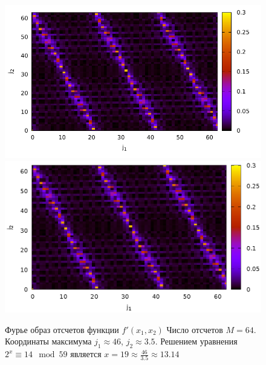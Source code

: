 \begin{figure}
\centering

\ifpdf
\includegraphics[angle=0]
{./part4/quantcomp/picdiscretlog4.pdf}
\else
\includegraphics[angle=0]
{./part4/quantcomp/picdiscretlog4.eps}
\fi

%

\caption{Фурье образ отсчетов функции 
$f'(x_1, x_2)$
Число отсчетов $M=64$. Координаты максимума $j_1 \approx 46$, $j_2 \approx 3.5$. 
Решением уравнения $2^x \equiv 14 \mod 59$
является $x = 19 \approx \frac{46}{3.5} \approx 13.14$
} 
\label{fig:part4:quantcomp:dl4}
\end{figure}
